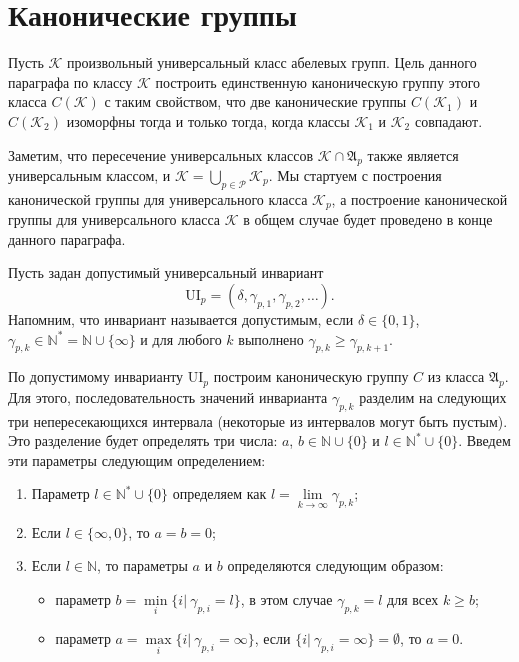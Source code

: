 \documentclass[a4paper,11pt,twoside]{article}
\def\A{{\mathfrak{A}}}
\def\K{{\mathcal{K}}}
\def\P{{\mathcal{P}}}
\def\N{{\mathbb{N}}}
\def\ui{{\mathrm{UI}}}
\begin{document}
\section{Канонические группы}\label{sec:CannonicalGroups}

Пусть $\K$ произвольный универсальный класс абелевых групп. Цель данного параграфа по классу $\K$ построить единственную каноническую группу этого класса $C(\K)$ с таким свойством, что две канонические группы $C(\K_1)$ и $C(\K_2)$ изоморфны тогда и только тогда, когда классы $\K_1$ и $\K_2$ совпадают.

Заметим, что пересечение универсальных классов $\K \cap \A_p$ также является универсальным классом, и $\K = \bigcup\limits_{p \in \P} \K_p$. Мы стартуем с построения канонической группы для универсального класса $\K_p$, а построение канонической группы для универсального класса $\K$ в общем случае будет проведено в конце данного параграфа.

Пусть задан допустимый универсальный инвариант 
$$\ui_p = (\delta, \gamma_{p,1}, \gamma_{p,2}, \ldots).$$
Напомним, что инвариант называется допустимым, если $\delta \in \{0,1\}$, $\gamma_{p,k} \in \N^* = \N \cup \{\infty\}$ и для любого $k$ выполнено $\gamma_{p,k} \geq \gamma_{p, k+1}$.

По допустимому инварианту $\ui_p$ построим каноническую группу $C$ из класса $\A_p$. Для этого, последовательность значений инварианта $\gamma_{p,k}$ разделим на следующих три непересекающихся интервала (некоторые из интервалов могут быть пустым). Это разделение будет определять три числа: $a$, $b \in \N \cup \{0\}$ и $l \in \N^* \cup \{0\}$. Введем эти параметры следующим определением:
\begin{enumerate}
\item Параметр $l \in \N^* \cup \{0\}$ определяем как $l = \lim\limits_{k \rightarrow \infty} \gamma_{p,k}$;
\item Если $l \in \{\infty, 0\}$, то $a = b = 0$;
\item Если $l \in \N$, то параметры $a$ и $b$ определяются следующим образом:
\begin{itemize}
\item параметр $b = \min\limits_{i} \{ i | \ \gamma_{p,i} = l\}$, в этом случае $\gamma_{p,k} = l$ для всех $k \geq b$;
\item параметр $a = \max\limits_{i} \{i | \ \gamma_{p,i} = \infty\}$, если $\{i | \ \gamma_{p,i} = \infty\} = \emptyset$, то $a = 0$.
\end{itemize}
\end{enumerate}
\end{document}
